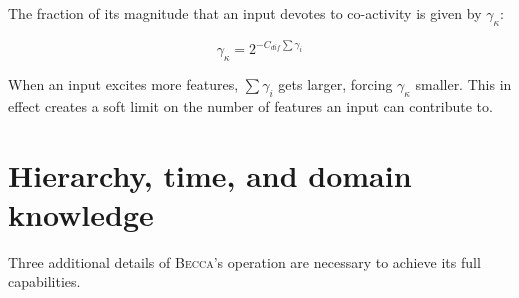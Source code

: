 The fraction of its magnitude that an input devotes to co-activity is given by $\gamma_\kappa$:

\begin{equation}
\gamma_\kappa = 2 ^ { - C_{dif}\sum \gamma_i}
\end{equation}

When an input excites more features, $\sum \gamma_i$ gets larger, forcing $\gamma_\kappa$ smaller. This in effect creates a soft limit on the number of features an input can contribute to. 

\section{Hierarchy, time, and domain knowledge} 

Three additional details of \textsc{Becca}'s operation are necessary to achieve its full capabilities. 

